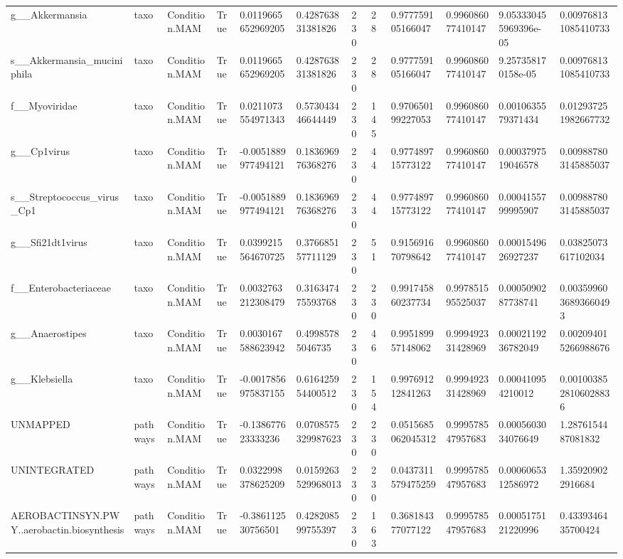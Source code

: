 \begin{longtable}{llllllllllll}
g\_\_Akkermansia & taxo & Condition.MAM & True & 0.0119665652969205 & 0.428763831381826 & 230 & 28 & 0.977759105166047 & 0.996086077410147 & 9.053330455969396e-05 & 0.009768131085410733 \\
s\_\_Akkermansia\_muciniphila & taxo & Condition.MAM & True & 0.0119665652969205 & 0.428763831381826 & 230 & 28 & 0.977759105166047 & 0.996086077410147 & 9.257358170158e-05 & 0.009768131085410733 \\
f\_\_Myoviridae & taxo & Condition.MAM & True & 0.0211073554971343 & 0.573043446644449 & 230 & 145 & 0.970650199227053 & 0.996086077410147 & 0.0010635579371434 & 0.012937251982667732 \\
g\_\_Cp1virus & taxo & Condition.MAM & True & -0.0051889977494121 & 0.183696976368276 & 230 & 44 & 0.977489715773122 & 0.996086077410147 & 0.0003797519046578 & 0.009887803145885037 \\
s\_\_Streptococcus\_virus\_Cp1 & taxo & Condition.MAM & True & -0.0051889977494121 & 0.183696976368276 & 230 & 44 & 0.977489715773122 & 0.996086077410147 & 0.0004155799995907 & 0.009887803145885037 \\
g\_\_Sfi21dt1virus & taxo & Condition.MAM & True & 0.0399215564670725 & 0.376685157711129 & 230 & 51 & 0.915691670798642 & 0.996086077410147 & 0.0001549626927237 & 0.03825073617102034 \\
f\_\_Enterobacteriaceae & taxo & Condition.MAM & True & 0.0032763212308479 & 0.316347475593768 & 230 & 230 & 0.991745860237734 & 0.997851595525037 & 0.0005090287738741 & 0.0035996036893660493 \\
g\_\_Anaerostipes & taxo & Condition.MAM & True & 0.0030167588623942 & 0.49985785046735 & 230 & 46 & 0.995189957148062 & 0.999492331428969 & 0.0002119236782049 & 0.002094015266988676 \\
g\_\_Klebsiella & taxo & Condition.MAM & True & -0.0017856975837155 & 0.616425954400512 & 230 & 154 & 0.997691212841263 & 0.999492331428969 & 0.000410954210012 & 0.0010038528106028836 \\
UNMAPPED & pathways & Condition.MAM & True & -0.138677623333236 & 0.0708575329987623 & 230 & 230 & 0.0515685062045312 & 0.999578547957683 & 0.0005603034076649 & 1.2876154487081832 \\
UNINTEGRATED & pathways & Condition.MAM & True & 0.0322998378625209 & 0.0159263529968013 & 230 & 230 & 0.0437311579475259 & 0.999578547957683 & 0.0006065312586972 & 1.359209022916684 \\
AEROBACTINSYN.PWY..aerobactin.biosynthesis & pathways & Condition.MAM & True & -0.386112530756501 & 0.428208599755397 & 230 & 163 & 0.368184377077122 & 0.999578547957683 & 0.0005175121220996 & 0.4339346435700424 \\

\end{longtable}

